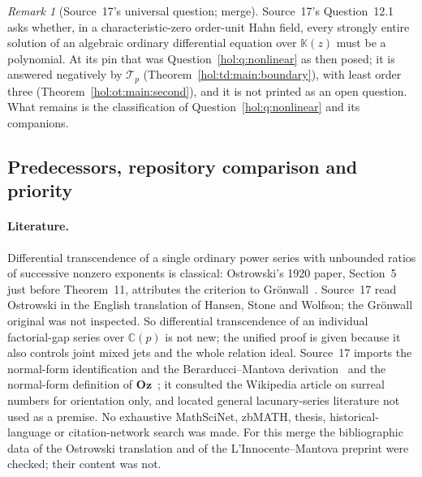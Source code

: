 \documentclass[11pt]{article}
\numberwithin{equation}{section}
\theoremstyle{definition}
\theoremstyle{remark}
\newtheorem{remark}[theorem]{Remark}
\newcommand{\C}{\mathbb C}
\newcommand{\KK}{\mathbb K}
\newcommand{\Oz}{\mathbf{Oz}}
\begin{document}
\begin{remark}[Source~17's universal question; merge]
\label{hol:fh:rem:universal}
Source~17's Question~12.1 asks whether, in a characteristic-zero order-unit
Hahn field, every strongly entire solution of an algebraic ordinary
differential equation over $\KK(z)$ must be a polynomial. At its pin that was
Question~\ref{hol:q:nonlinear} as then posed; it is answered negatively by
$\mathcal T_p$ (Theorem~\ref{hol:td:main:boundary}), with least order three
(Theorem~\ref{hol:ot:main:second}), and it is not printed as an open question.
What remains is the classification of Question~\ref{hol:q:nonlinear} and its
companions.
\end{remark}

\subsection{Predecessors, repository comparison and priority}
\label{hol:fh:sub:predecessors}

\paragraph{Literature.}
Differential transcendence of a single ordinary power series with unbounded
ratios of successive nonzero exponents is classical: Ostrowski's 1920 paper,
Section~5 just before Theorem~11, attributes the criterion to
Gr\"onwall~\cite{ostrowski}. Source~17 read Ostrowski in the English
translation of Hansen, Stone and Wolfson; the Gr\"onwall original was not
inspected. So differential transcendence of an individual factorial-gap series
over $\C(p)$ is not new; the unified proof is given because it also controls
joint mixed jets and the whole relation ideal. Source~17 imports the
normal-form identification and the Berarducci--Mantova derivation~\cite{bm,bgexp}
and the normal-form definition of $\Oz$~\cite{lmfactor}; it consulted the
Wikipedia article on surreal numbers for orientation only, and located general
lacunary-series literature not used as a premise. No exhaustive MathSciNet,
zbMATH, thesis, historical-language or citation-network search was made. For
this merge the bibliographic data of the Ostrowski translation and of the
L'Innocente--Mantova preprint were checked; their content was not.
\end{document}
